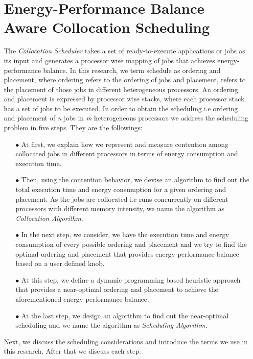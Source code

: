 
\section{Energy-Performance Balance Aware Collocation Scheduling}
\label{subsection:scheduler}
The \emph{Collocation Scheduler} takes
a set of ready-to-execute applications or jobs as its input and generates a processor wise mapping of
jobs that achieves energy-performance balance. In this research, we term schedule as ordering and
placement, where ordering refers to the ordering of jobs and placement, refers to the placement of those
jobs in different heterogeneous processors. An ordering and placement is expressed by processor wise
stacks, where each processor stack has a set of jobs to be executed.
In order to obtain the scheduling i.e ordering and placement
of \emph{n} jobs in \emph{m} heterogeneous processors we address the scheduling problem in five steps.
They are the followings:

\begin{itemize}
         \item[$\bullet$] At first, we explain how we represent and measure contention among collocated jobs
in different processors in terms of energy consumption and execution time.
        \item [$\bullet$] Then, using the contention behavior, we devise an algorithm to find out the total
execution time and energy consumption for a given ordering and placement. As the jobs are collocated
i.e runs concurrently on different processors with different memory intensity, we name the algorithm as
\emph{Collocation Algorithm}.
        \item [$\bullet$] In the next step, we consider, we have the execution time and energy consumption of
every possible ordering and placement and we try to find the optimal ordering and placement that provides
energy-performance balance based on a user defined knob.
        \item [$\bullet$] At this step, we define a dynamic programming based heuristic approach that
provides a near-optimal ordering and placement to achieve the aforementioned energy-performance balance.
       \item [$\bullet$] At the last step, we design an algorithm to find out the near-optimal scheduling and
we name the algorithm as \emph{Scheduling Algorithm}.
\end{itemize}


Next, we discuss the scheduling considerations and introduce the terms we use in this research. After
that we discuss each step.


